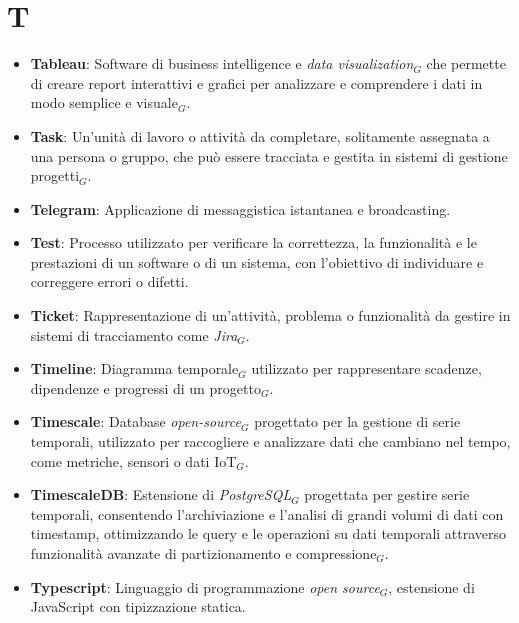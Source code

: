 \section{T}
\begin{itemize}
    \item \textbf{Tableau}: Software di business intelligence e \textit{data visualization}$_G$ che permette di creare report interattivi e grafici per analizzare e comprendere i dati in modo semplice e visuale$_G$.
    \item \textbf{Task}: Un'unità di lavoro o attività da completare, solitamente assegnata a una persona o gruppo, che può essere tracciata e gestita in sistemi di gestione progetti$_G$.
    \item \textbf{Telegram}: Applicazione di messaggistica istantanea e broadcasting.
    \item \textbf{Test}: Processo utilizzato per verificare la correttezza, la funzionalità e le prestazioni di un software o di un sistema, con l'obiettivo di individuare e correggere errori o difetti.
    \item \textbf{Ticket}: Rappresentazione di un’attività, problema o funzionalità da gestire in sistemi di tracciamento come \textit{Jira}$_G$.
    \item \textbf{Timeline}: Diagramma temporale$_G$ utilizzato per rappresentare scadenze, dipendenze e progressi di un progetto$_G$.
    \item \textbf{Timescale}: Database \textit{open-source}$_G$ progettato per la gestione di serie temporali, utilizzato per raccogliere e analizzare dati che cambiano nel tempo, come metriche, sensori o dati IoT$_G$.
    \item \textbf{TimescaleDB}: Estensione di \textit{PostgreSQL}$_G$ progettata per gestire serie temporali, consentendo l'archiviazione e l'analisi di grandi volumi di dati con timestamp, ottimizzando le query e le operazioni su dati temporali attraverso funzionalità avanzate di partizionamento e compressione$_G$.
    \item \textbf{Typescript}: Linguaggio di programmazione \textit{open source}$_G$, estensione di JavaScript con tipizzazione statica.
\end{itemize}
